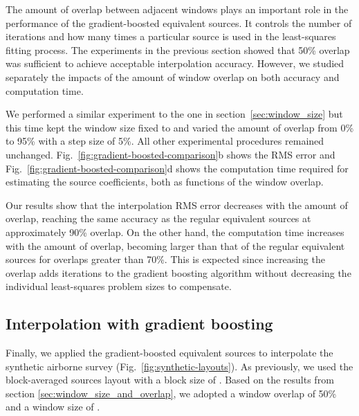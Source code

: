 The amount of overlap between adjacent windows plays an important role in the
performance of the gradient-boosted equivalent sources.
It controls the number of iterations and how many times a particular source is
used in the least-squares fitting process.
The experiments in the previous section showed that 50\% overlap was
sufficient to achieve acceptable interpolation accuracy.
However, we studied separately the impacts of the amount of window overlap on
both accuracy and computation time.

We performed a similar experiment to the one in section~\ref{sec:window_size}
but this time kept the window size fixed to \BoostOverlappingWindowSize{} and
varied the amount of overlap from 0\% to 95\% with a step size of 5\%.
All other experimental procedures remained unchanged.
Fig.~\ref{fig:gradient-boosted-comparison}b shows the RMS error and
Fig.~\ref{fig:gradient-boosted-comparison}d shows the computation time
required for estimating the source coefficients, both as functions of
the window overlap.

Our results show that the interpolation RMS error decreases with the amount of
overlap, reaching the same accuracy as the regular equivalent sources at
approximately 90\% overlap.
On the other hand, the computation time increases with the amount of overlap,
becoming larger than that of the regular equivalent sources for overlaps
greater than 70\%.
This is expected since increasing the overlap adds iterations to the gradient
boosting algorithm without decreasing the individual least-squares problem
sizes to compensate.


\subsection{
    Interpolation with gradient boosting
}
\label{sec:gb_interpolation}

Finally, we applied the gradient-boosted equivalent sources to interpolate the
synthetic airborne survey (Fig.~\ref{fig:synthetic-layouts}).
As previously, we used the block-averaged sources layout with a block size of
\EqlBoostAirborneSpacing{}.
Based on the results from section \ref{sec:window_size_and_overlap}, we adopted
a window overlap of 50\% and a window size of \EqlBoostAirborneWindowSize{}.

